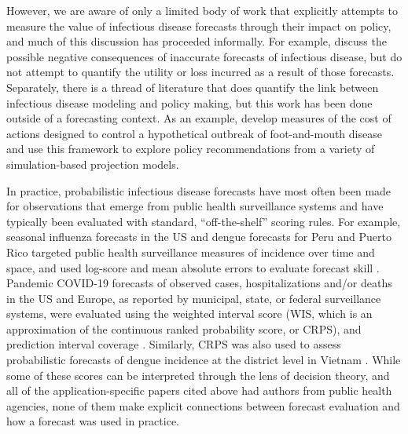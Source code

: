 \documentclass{article}
\begin{document}


However, we are aware of only a limited body of work that explicitly attempts to measure the value of infectious disease forecasts through their impact on policy, and much of this discussion has proceeded informally. For example, \cite{ioannidis2022forecastingCOVIDfailed} discuss the possible negative consequences of inaccurate forecasts of infectious disease, but do not attempt to quantify the utility or loss incurred as a result of those forecasts. Separately, there is a thread of literature that does quantify the link between infectious disease modeling and policy making, but this work has been done outside of a forecasting context. As an example, \cite{Probert2016decisionMakingFootMouth} develop measures of the cost of actions designed to control a hypothetical outbreak of foot-and-mouth disease and use this framework to explore policy recommendations from a variety of simulation-based projection models.

In practice, probabilistic infectious disease forecasts have most often been made for observations that emerge from public health surveillance systems and have typically been evaluated with standard, ``off-the-shelf'' scoring rules.
For example, seasonal influenza forecasts in the US and dengue forecasts for Peru and Puerto Rico targeted public health surveillance measures of incidence over time and space, and used log-score and mean absolute errors to evaluate forecast skill \citep{mcgowan_collaborative_2019,reich_collaborative_2019,johansson_open_2019}.
Pandemic COVID-19 forecasts of observed cases, hospitalizations and/or deaths in the US and Europe, as reported by municipal, state, or federal surveillance systems, were evaluated using the weighted interval score (WIS, which is an approximation of the continuous ranked probability score, or CRPS), and prediction interval coverage \citep{cramer_evaluation_2022,fox_real-time_2022,sherratt2023predictive}.
Similarly, CRPS was also used to assess probabilistic forecasts of dengue incidence at the district level in Vietnam \citep{colon-gonzalez_probabilistic_2021}.
While some of these scores can be interpreted through the lens of decision theory, and all of the application-specific papers cited above had authors from public health agencies, none of them make explicit connections between forecast evaluation and how a forecast was used in practice.
\end{document}
